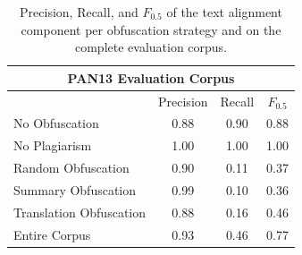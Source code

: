 \begin{table}[ht]
    \centering
    \caption{Precision, Recall, and $F_{0.5}$ of the text alignment component per obfuscation strategy and on the complete evaluation corpus.}
    \label{tab:evaluation}
    \begin{tabular}{lccc}
    \multicolumn{4}{c}{\bfseries PAN13 Evaluation Corpus} \\
    \toprule
                            &  Precision &  Recall &$F_{0.5}$ \\
    \midrule
    No Obfuscation          &       0.88 &    0.90 &  0.88 \\
    No Plagiarism           &       1.00 &    1.00 &  1.00 \\
    Random Obfuscation      &       0.90 &    0.11 &  0.37 \\
    Summary Obfuscation     &       0.99 &    0.10 &  0.36 \\
    Translation Obfuscation &       0.88 &    0.16 &  0.46 \\ \midrule
    Entire Corpus           &       0.93 &    0.46 &  0.77 \\
    \bottomrule
    \end{tabular}
\end{table}
